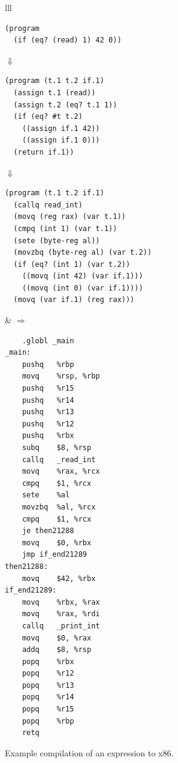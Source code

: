 \documentclass[11pt]{book}
\begin{document}
\begin{figure}[tbp]
\begin{tabular}{lll}
\begin{minipage}{0.5\textwidth}
\begin{lstlisting}
(program
  (if (eq? (read) 1) 42 0))
\end{lstlisting}
$\Downarrow$
\begin{lstlisting}
(program (t.1 t.2 if.1)
  (assign t.1 (read))
  (assign t.2 (eq? t.1 1))
  (if (eq? #t t.2)
    ((assign if.1 42))
    ((assign if.1 0)))
  (return if.1))
\end{lstlisting}
$\Downarrow$
\begin{lstlisting}
(program (t.1 t.2 if.1)
  (callq read_int)
  (movq (reg rax) (var t.1))
  (cmpq (int 1) (var t.1))
  (sete (byte-reg al))
  (movzbq (byte-reg al) (var t.2))
  (if (eq? (int 1) (var t.2))
    ((movq (int 42) (var if.1)))
    ((movq (int 0) (var if.1))))
  (movq (var if.1) (reg rax)))
\end{lstlisting}
\end{minipage}
&
$\Rightarrow$
\begin{minipage}{0.4\textwidth}
\begin{lstlisting}
	.globl _main
_main:
	pushq	%rbp
	movq	%rsp, %rbp
	pushq	%r15
	pushq	%r14
	pushq	%r13
	pushq	%r12
	pushq	%rbx
	subq	$8, %rsp
	callq	_read_int
	movq	%rax, %rcx
	cmpq	$1, %rcx
	sete	%al
	movzbq	%al, %rcx
	cmpq	$1, %rcx
	je then21288
	movq	$0, %rbx
	jmp if_end21289
then21288:
	movq	$42, %rbx
if_end21289:
	movq	%rbx, %rax
	movq	%rax, %rdi
	callq	_print_int
	movq	$0, %rax
	addq	$8, %rsp
	popq	%rbx
	popq	%r12
	popq	%r13
	popq	%r14
	popq	%r15
	popq	%rbp
	retq
\end{lstlisting}
\end{minipage}
\end{tabular} 
\caption{Example compilation of an  expression to x86.}
\label{fig:if-example-x86}
\end{figure}
\end{document}

